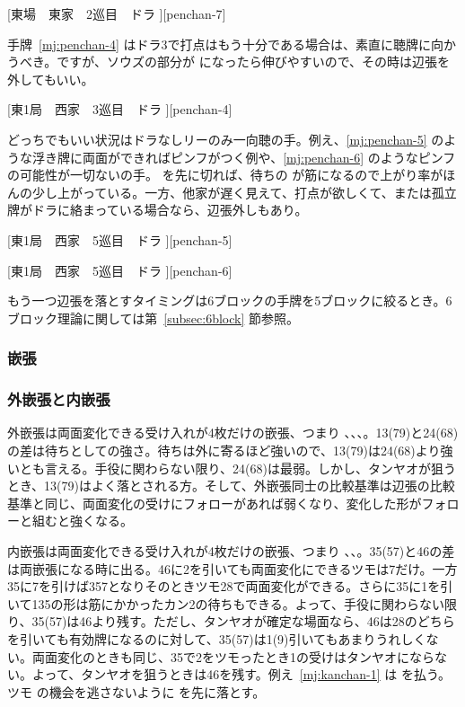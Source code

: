 \documentclass[../nankiru_main.tex]{subfiles}
\begin{document}
[東場　東家　2巡目　ドラ ][penchan-7]

手牌~\ref{mj:penchan-4} はドラ3で打点はもう十分である場合は、素直に聴牌に向かうべき。ですが、ソウズの部分が  になったら伸びやすいので、その時は辺張を外してもいい。

[東1局　西家　3巡目　ドラ ][penchan-4]

どっちでもいい状況はドラなしリーのみ一向聴の手\citep{yuusee-126}。例え、\ref{mj:penchan-5} のような浮き牌に両面ができればピンフがつく例や、\ref{mj:penchan-6} のようなピンフの可能性が一切ないの手。 を先に切れば、待ちの  が筋になるので上がり率がほんの少し上がっている。一方、他家が遅く見えて、打点が欲しくて、または孤立牌がドラに絡まっている場合なら、辺張外しもあり。

[東1局　西家　5巡目　ドラ ][penchan-5]

[東1局　西家　5巡目　ドラ ][penchan-6]

もう一つ辺張を落とすタイミングは6ブロックの手牌を5ブロックに絞るとき。6ブロック理論に関しては第~\ref{subsec:6block} 節参照。

\subsubsection{嵌張}

\subsubsection*{外嵌張と内嵌張}

外嵌張は両面変化できる受け入れが4枚だけの嵌張、つまり 、、、。13(79)と24(68)の差は待ちとしての強さ。待ちは外に寄るほど強いので、13(79)は24(68)より強いとも言える。手役に関わらない限り、24(68)は最弱。しかし、タンヤオが狙うとき、13(79)はよく落とされる方。そして、外嵌張同士の比較基準は辺張の比較基準と同じ、両面変化の受けにフォローがあれば弱くなり、変化した形がフォローと組むと強くなる\citep{gendai-sotokanchan}。

内嵌張は両面変化できる受け入れが4枚だけの嵌張、つまり 、、。35(57)と46の差は両嵌張になる時に出る。46に2を引いても両面変化にできるツモは7だけ。一方35に7を引けば357となりそのときツモ28で両面変化ができる。さらに35に1を引いて135の形は筋にかかったカン2の待ちもできる。よって、手役に関わらない限り、35(57)は46より残す\citep{yuusee-kanchan}。ただし、タンヤオが確定な場面なら、46は28のどちらを引いても有効牌になるのに対して、35(57)は1(9)引いてもあまりうれしくない。両面変化のときも同じ、35で2をツモったとき1の受けはタンヤオにならない。よって、タンヤオを狙うときは46を残す。例え~\ref{mj:kanchan-1} は  を払う。ツモ  の機会を逃さないように  を先に落とす。
\end{document}
